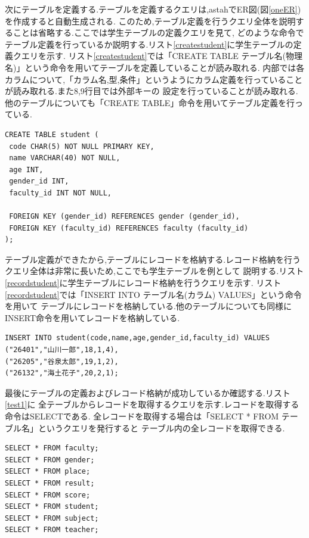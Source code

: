 \documentclass[a4j]{jarticle}
\begin{document}
    次にテーブルを定義する.テーブルを定義するクエリは,astahでER図(図\ref{oneER})を作成すると自動生成される.
    このため,テーブル定義を行うクエリ全体を説明することは省略する.ここでは学生テーブルの定義クエリを見て,
    どのような命令でテーブル定義を行っているか説明する.リスト\ref{createstudent}に学生テーブルの定義クエリを示す.
    リスト\ref{createstudent}では「CREATE TABLE テーブル名(物理名)」という命令を用いてテーブルを定義していることが読み取れる.
    内部では各カラムについて,「カラム名,型,条件」というようにカラム定義を行っていることが読み取れる.また8,9行目では外部キーの
    設定を行っていることが読み取れる.他のテーブルについても「CREATE TABLE」命令を用いてテーブル定義を行っている.

    \begin{lstlisting}[basicstyle=\ttfamily\footnotesize, frame=single,label=createstudent,caption=学生テーブルの定義]
CREATE TABLE student (
 code CHAR(5) NOT NULL PRIMARY KEY,
 name VARCHAR(40) NOT NULL,
 age INT,
 gender_id INT,
 faculty_id INT NOT NULL,

 FOREIGN KEY (gender_id) REFERENCES gender (gender_id),
 FOREIGN KEY (faculty_id) REFERENCES faculty (faculty_id)
);
    \end{lstlisting}

    テーブル定義ができたから,テーブルにレコードを格納する.レコード格納を行うクエリ全体は非常に長いため,ここでも学生テーブルを例として
    説明する.リスト\ref{recordstudent}に学生テーブルにレコード格納を行うクエリを示す.
    リスト\ref{recordstudent}では「INSERT INTO テーブル名(カラム) VALUES」という命令を用いて
    テーブルにレコードを格納している.他のテーブルについても同様にINSERT命令を用いてレコードを格納している.
 \begin{lstlisting}[basicstyle=\ttfamily\footnotesize, frame=single,label=recordstudent,caption=学生テーブルのレコード格納]
INSERT INTO student(code,name,age,gender_id,faculty_id) VALUES
("26401","山川一郎",18,1,4),
("26205","谷泉太郎",19,1,2),
("26132","海土花子",20,2,1);
\end{lstlisting}

  最後にテーブルの定義およびレコード格納が成功しているか確認する.リスト\ref{test1}に
  全テーブルからレコードを取得するクエリを示す.レコードを取得する命令はSELECTである.
  全レコードを取得する場合は「SELECT * FROM テーブル名」というクエリを発行すると
  テーブル内の全レコードを取得できる.
  \begin{lstlisting}[basicstyle=\ttfamily\footnotesize, frame=single,label=test1,caption=全テーブルからレコードを取得するクエリ]
SELECT * FROM faculty;
SELECT * FROM gender;
SELECT * FROM place;
SELECT * FROM result;
SELECT * FROM score;
SELECT * FROM student;
SELECT * FROM subject;
SELECT * FROM teacher;
  \end{lstlisting}
\end{document}

